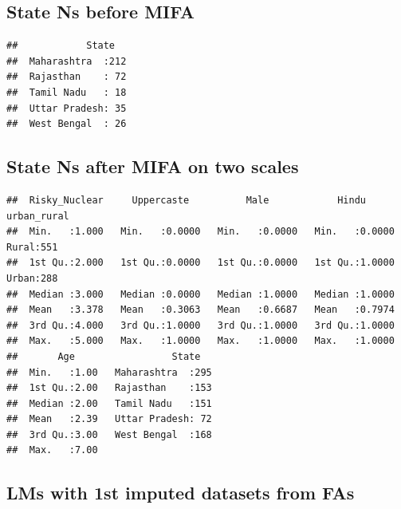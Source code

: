 \documentclass[
]{article}
\begin{document}
\hypertarget{state-ns-before-mifa}{%
\subsection{State Ns before MIFA}\label{state-ns-before-mifa}}

\begin{verbatim}
##            State    
##  Maharashtra  :212  
##  Rajasthan    : 72  
##  Tamil Nadu   : 18  
##  Uttar Pradesh: 35  
##  West Bengal  : 26
\end{verbatim}

\hypertarget{state-ns-after-mifa-on-two-scales}{%
\subsection{State Ns after MIFA on two
scales}\label{state-ns-after-mifa-on-two-scales}}

\begin{verbatim}
##  Risky_Nuclear     Uppercaste          Male            Hindu        urban_rural
##  Min.   :1.000   Min.   :0.0000   Min.   :0.0000   Min.   :0.0000   Rural:551  
##  1st Qu.:2.000   1st Qu.:0.0000   1st Qu.:0.0000   1st Qu.:1.0000   Urban:288  
##  Median :3.000   Median :0.0000   Median :1.0000   Median :1.0000              
##  Mean   :3.378   Mean   :0.3063   Mean   :0.6687   Mean   :0.7974              
##  3rd Qu.:4.000   3rd Qu.:1.0000   3rd Qu.:1.0000   3rd Qu.:1.0000              
##  Max.   :5.000   Max.   :1.0000   Max.   :1.0000   Max.   :1.0000              
##       Age                 State    
##  Min.   :1.00   Maharashtra  :295  
##  1st Qu.:2.00   Rajasthan    :153  
##  Median :2.00   Tamil Nadu   :151  
##  Mean   :2.39   Uttar Pradesh: 72  
##  3rd Qu.:3.00   West Bengal  :168  
##  Max.   :7.00
\end{verbatim}

\hypertarget{lms-with-1st-imputed-datasets-from-fas}{%
\subsection{LMs with 1st imputed datasets from
FAs}\label{lms-with-1st-imputed-datasets-from-fas}}
\end{document}
